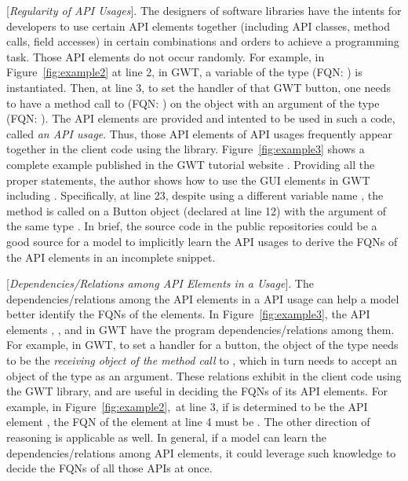 \vspace{2pt}
 [{\em Regularity of API Usages}]. The
designers of software libraries have the intents for developers to use
certain API elements together (including API classes, method calls,
field accesses) in certain combinations and orders to achieve a
programming task. Those API elements do not occur randomly. For
example, in Figure~\ref{fig:example2} at line 2, in GWT, a variable of
the type  (FQN:
) is instantiated. Then, at
line 3, to set the handler of that GWT button, one needs to have a
method call to  (FQN:
) on
the  object with an argument of the type
 (FQN:
).  The
API elements are provided and intented to be used in such a code,
called {\em an API usage}. Thus, those API elements of API usages
frequently appear together in the client code using the
library. Figure~\ref{fig:example3} shows a complete example published
in the GWT tutorial website . Providing all the
proper  statements, the author shows how to use the GUI
elements in GWT including . Specifically, at line 23,
despite using a different variable name , the
method  is called on a Button object (declared
at line 12) with the argument of the same type . In
brief, the source code in the public repositories could be a good
source for a model to implicitly learn the API usages to derive the
FQNs of the API elements in an incomplete snippet.



\vspace{2pt}
 [{\em Dependencies/Relations among API
    Elements in a Usage}]. The dependencies/relations among the API
elements in a API usage can help a model better identify the FQNs of
the elements.  In Figure~\ref{fig:example3}, the API elements
, , and  in GWT
have the program dependencies/relations among them. For example, in
GWT, to set a handler for a button, the object of the type
 needs to be the {\em receiving object of the method
  call} to , which in turn needs to accept an
object of the type  as an argument. These relations
exhibit in the client code using the GWT library, and are useful in
deciding the FQNs of its API elements. For example, in
Figure~\ref{fig:example2},~at line 3, if  is
determined to be the API element
, the
FQN of the element at line 4 must be
.  The
other direction of reasoning is applicable as well. In general, if a
model can learn the dependencies/relations among API elements, it
could leverage such knowledge to decide the FQNs of all those APIs at once.


